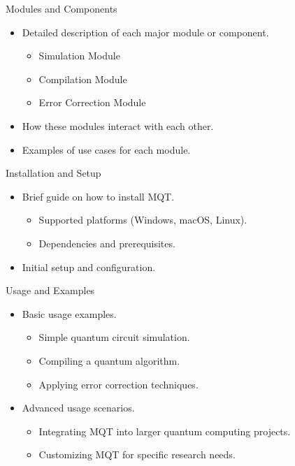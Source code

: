 \documentclass{beamer}
\begin{document}
\begin{frame}{Modules and Components}
    \begin{itemize}
        \item Detailed description of each major module or component.
        \begin{itemize}
            \item Simulation Module
            \item Compilation Module
            \item Error Correction Module
        \end{itemize}
        \item How these modules interact with each other.
        \item Examples of use cases for each module.
    \end{itemize}
\end{frame}

\begin{frame}{Installation and Setup}
    \begin{itemize}
        \item Brief guide on how to install MQT.
        \begin{itemize}
            \item Supported platforms (Windows, macOS, Linux).
            \item Dependencies and prerequisites.
        \end{itemize}
        \item Initial setup and configuration.
    \end{itemize}
\end{frame}

\begin{frame}{Usage and Examples}
    \begin{itemize}
        \item Basic usage examples.
        \begin{itemize}
            \item Simple quantum circuit simulation.
            \item Compiling a quantum algorithm.
            \item Applying error correction techniques.
        \end{itemize}
        \item Advanced usage scenarios.
        \begin{itemize}
            \item Integrating MQT into larger quantum computing projects.
            \item Customizing MQT for specific research needs.
        \end{itemize}
    \end{itemize}
\end{frame}
\end{document}
